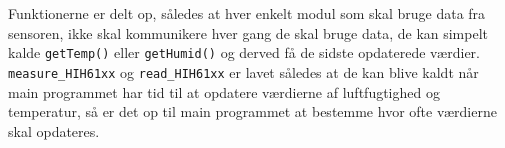 Funktionerne er delt op, således at hver enkelt modul som skal bruge data fra sensoren, ikke skal kommunikere hver gang de skal bruge data, de kan simpelt kalde \texttt{getTemp()} eller \texttt{getHumid()} og derved få de sidste opdaterede værdier. \texttt{measure\_HIH61xx} og \texttt{read\_HIH61xx} er lavet således at de kan blive kaldt når main programmet har tid til at opdatere værdierne af luftfugtighed og temperatur, så er det op til main programmet at bestemme hvor ofte værdierne skal opdateres. 

%
%
%
%
%
%
%
%
%

